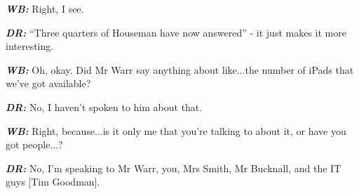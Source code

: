 \textit{\textbf{WB:}} Right, I see.

\textit{\textbf{DR:}} ``Three quarters of Houseman have now answered'' - it just makes it more interesting.

\textit{\textbf{WB:}} Oh, okay. Did Mr Warr say anything about like...the number of iPads that we've got available?

\textit{\textbf{DR:}} No, I haven't spoken to him about that.

\textit{\textbf{WB:}} Right, because...is it only me that you're talking to about it, or have you got people...?

\textit{\textbf{DR:}} No, I'm speaking to Mr Warr, you, Mrs Smith, Mr Bucknall, and the IT guys [Tim Goodman].

